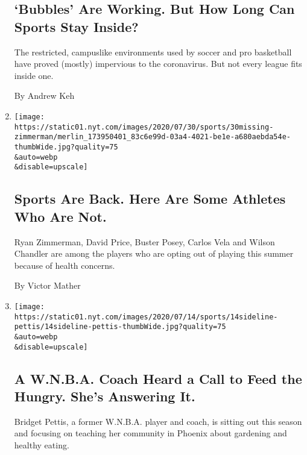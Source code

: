 \begin{enumerate}
  \hypertarget{bubbles-are-working-but-how-long-can-sports-stay-inside}{%
  \subsection{`Bubbles' Are Working. But How Long Can Sports Stay
  Inside?}\label{bubbles-are-working-but-how-long-can-sports-stay-inside}}

  The restricted, campuslike environments used by soccer and pro
  basketball have proved (mostly) impervious to the coronavirus. But not
  every league fits inside one.

  By Andrew Keh
\item
  \href{/2020/07/30/sports/players-opt-out.html}{}

  \texttt{[image: https://static01.nyt.com/images/2020/07/30/sports/30missing-zimmerman/merlin\_173950401\_83c6e99d-03a4-4021-be1e-a680aebda54e-thumbWide.jpg?quality=75\\\&auto=webp\\\&disable=upscale]}

  \hypertarget{sports-are-back-here-are-some-athletes-who-are-not}{%
  \subsection{Sports Are Back. Here Are Some Athletes Who Are
  Not.}\label{sports-are-back-here-are-some-athletes-who-are-not}}

  Ryan Zimmerman, David Price, Buster Posey, Carlos Vela and Wilson
  Chandler are among the players who are opting out of playing this
  summer because of health concerns.

  By Victor Mather
\item
  \href{/2020/07/30/sports/basketball/wnba-bridget-pettis.html}{}

  \texttt{[image: https://static01.nyt.com/images/2020/07/14/sports/14sideline-pettis/14sideline-pettis-thumbWide.jpg?quality=75\\\&auto=webp\\\&disable=upscale]}

  \hypertarget{a-wnba-coach-heard-a-call-to-feed-the-hungry-shes-answering-it}{%
  \subsection{A W.N.B.A. Coach Heard a Call to Feed the Hungry. She's
  Answering
  It.}\label{a-wnba-coach-heard-a-call-to-feed-the-hungry-shes-answering-it}}

  Bridget Pettis, a former W.N.B.A. player and coach, is sitting out
  this season and focusing on teaching her community in Phoenix about
  gardening and healthy eating.


\end{enumerate}
